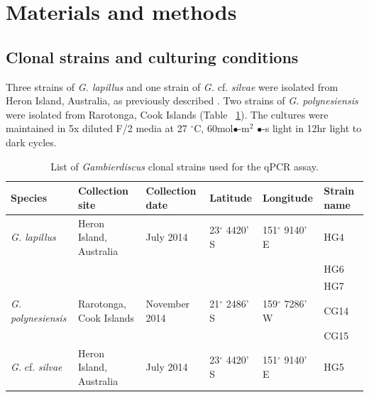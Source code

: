 \documentclass[10pt,letterpaper]{article}
\begin{document}
\section*{Materials and methods}
\subsection*{Clonal strains and culturing conditions}
\FloatBarrier
Three strains of \emph{G. lapillus} and one strain of \emph{G.} cf. \emph{silvae} were isolated from Heron Island, Australia, as previously described \citep{kretzschmar2017characterization}. 
Two strains of \emph{G. polynesiensis} were isolated from Rarotonga, Cook Islands (Table ~\ref{tbl:StrainTable}). 
The cultures were maintained in 5x diluted F/2 media \cite{holmes1991strain} at 27 $^{\circ}$C, 60mol$\bullet$-m$^{2}$ $\bullet$-s light in 12hr light to dark cycles.
\begin{table}  
\caption{List of \emph{Gambierdiscus} clonal strains used for the qPCR assay.}
\label{tbl:StrainTable}
\begin{tabular}{ | p{2cm} | p{2cm} | p{2cm}| p{3cm} | p{3cm} | p{2cm} | }
\hline
\textbf{Species} & \textbf{Collection site} & \textbf{Collection date} &\textbf{Latitude} & \textbf{Longitude} & \textbf{Strain name} \\
\hline
\emph{G. lapillus} &Heron Island, Australia &July 2014 &23$^{\circ}$ 4420' S&151$^{\circ}$ 9140' E & HG4 \\
\hline
&&&&& HG6\\
\hline
&&&& &HG7\\
\hline
\emph{G. polynesiensis}&Rarotonga, Cook Islands&November 2014 &21$^{\circ}$ 2486' S&159$^{\circ}$ 7286' W & CG14 \\
\hline
&&&&&CG15\\
\hline
\emph{G.} cf. \emph{silvae}&Heron Island, Australia &July 2014 &23$^{\circ}$ 4420' S&151$^{\circ}$ 9140' E& HG5\\
\hline
\end{tabular}
\end{table}
\FloatBarrier
\end{document}
